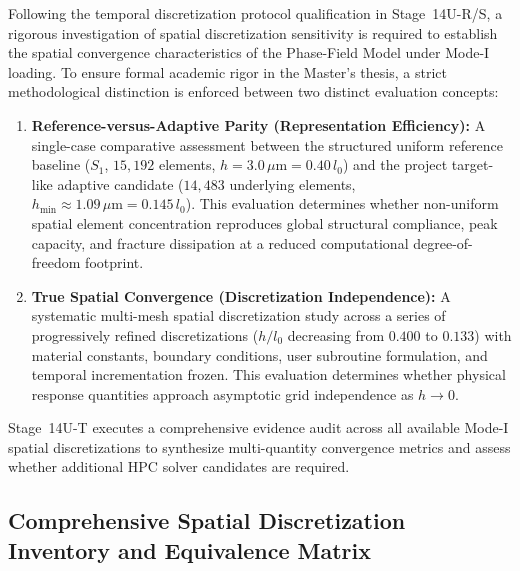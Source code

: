 Following the temporal discretization protocol qualification in Stage~14U-R/S, a rigorous investigation of spatial discretization sensitivity is required to establish the spatial convergence characteristics of the Phase-Field Model under Mode-I loading. To ensure formal academic rigor in the Master's thesis, a strict methodological distinction is enforced between two distinct evaluation concepts:
\begin{enumerate}
    \item \textbf{Reference-versus-Adaptive Parity (Representation Efficiency):} A single-case comparative assessment between the structured uniform reference baseline ($S_1$, $15,192$ elements, $h = 3.0\,\mu\mathrm{m} = 0.40\,l_0$) and the project target-like adaptive candidate ($14,483$ underlying elements, $h_{\min} \approx 1.09\,\mu\mathrm{m} = 0.145\,l_0$). This evaluation determines whether non-uniform spatial element concentration reproduces global structural compliance, peak capacity, and fracture dissipation at a reduced computational degree-of-freedom footprint.
    \item \textbf{True Spatial Convergence (Discretization Independence):} A systematic multi-mesh spatial discretization study across a series of progressively refined discretizations ($h/l_0$ decreasing from $0.400$ to $0.133$) with material constants, boundary conditions, user subroutine formulation, and temporal incrementation frozen. This evaluation determines whether physical response quantities approach asymptotic grid independence as $h \to 0$.
\end{enumerate}

Stage~14U-T executes a comprehensive evidence audit across all available Mode-I spatial discretizations to synthesize multi-quantity convergence metrics and assess whether additional HPC solver candidates are required.

\subsection{Comprehensive Spatial Discretization Inventory and Equivalence Matrix}
\label{subsec:stage14ut_inventory}

